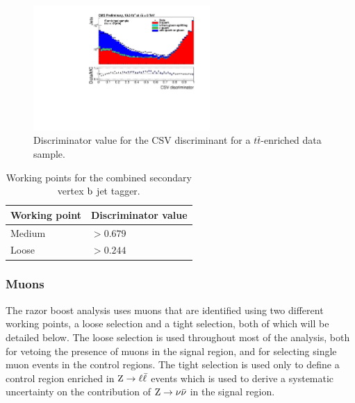 \begin{figure}[tpb]
  \centering
  \includegraphics[width=0.6\textwidth]{figures/eventreco_objects/CSV_Log_ttbar}
  \caption{ Discriminator value for the CSV discriminant for a $t\bar{t}$-enriched data sample.
  \label{fig:CSV_discriminant}}
\end{figure}

\begin{table}[htdp]
\caption{Working points for the combined secondary vertex $\mathrm{b}$ jet tagger.
\label{tab:object_btag}}
\begin{center}
\begin{tabular}{l l}
\toprule
Working point & Discriminator value \\
\midrule
Medium & $> 0.679$ \\
Loose & $> 0.244$ \\
\bottomrule
\end{tabular}
\end{center}
\end{table}



\subsubsection{Muons \label{sec:object_muon}}

The razor boost analysis uses muons that are identified using two different working
points, a loose selection and a tight selection, both of which will be detailed below. 
The loose selection is used throughout most of the analysis, both for vetoing the presence of muons
in the signal region, and for selecting single muon events in the control regions. The tight
selection is used only to define a control region enriched in $\mathrm{Z}\rightarrow
\ell\bar{\ell}$ events which is used to derive a systematic uncertainty on the contribution of
$\mathrm{Z}\rightarrow \nu\bar{\nu}$ in the signal region. 

